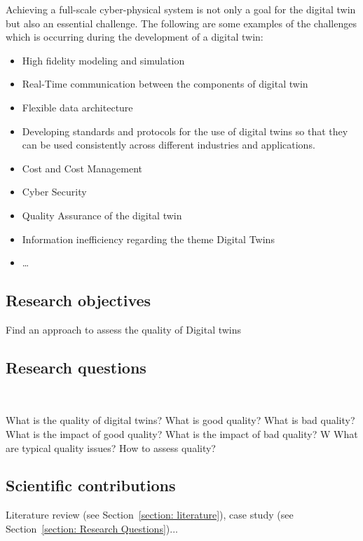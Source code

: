 \documentclass[9pt,conference]{IEEEtran}
\begin{document}
    Achieving a full-scale cyber-physical system is not only a goal for the digital twin but also an essential challenge. The following are some examples of the challenges which is occurring during the development of a digital twin:
    \begin{itemize}
        \item High fidelity modeling and simulation
        \item Real-Time communication between the components of digital twin 
        \item Flexible data architecture
        \item Developing standards and protocols for the use of digital twins so that they can be used consistently across different industries and applications.
        \item Cost and Cost Management
        \item Cyber Security
        \item Quality Assurance of the digital twin
        \item Information inefficiency regarding the theme Digital Twins
        \item \dots{}
    \end{itemize}
    
    \subsection{Research objectives}
    
    Find an approach to assess the quality of Digital twins

    \subsection{Research questions}~\label{section: Research Questions}

    What is the quality of digital twins? 
    What is good quality?
    What is bad quality? 
    What is the impact of good quality? 
    What is the impact of bad quality? W
    What are typical quality issues? 
    How to assess quality?

    \subsection{Scientific contributions}

    Literature review (see Section~\ref{section: literature}), case study (see Section~\ref{section: Research Questions})...
    
\end{document}
